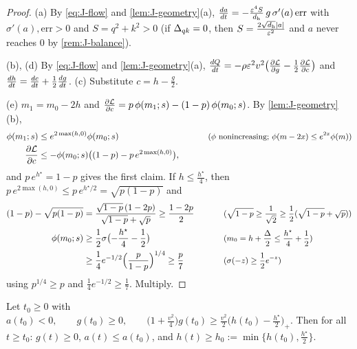 \begin{proof}
(a) By \cref{eq:J-flow} and \cref{lem:J-geometry}(a), $\ddt{a}=-\frac{\initscale^4S}{d_{\mathrm h}}\,g\,\sigma'(a)\,\mathrm{err}$ with $\sigma'(a),\mathrm{err}>0$ and $S=q^2+k^2>0$ (if $\Delta_{qk}=0$, then $S=\frac{2\sqrt{d_{\mathrm h}}|a|}{\varepsilon^2}$ and $a$ never reaches $0$ by \cref{rem:J-balance}).

(b), (d) By \cref{eq:J-flow} and \cref{lem:J-geometry}(a), $\ddt{Q}=-\rho\initscale^2v^2\bigl(\pd{\mathcal L}{g}-\frac{1}{2}\pd{\mathcal L}{c}\bigr)$ and
$\ddt{h}=\ddt{c}+\frac{1}{2}\ddt{g}$. (c) Substitute $c=h-\frac{g}{2}$.

(e) $m_1=m_0-2h$ and $\pd{\mathcal L}{c}=p\,\phi(m_1;s)-(1-p)\,\phi(m_0;s)$. By \cref{lem:J-geometry}(b),
\begin{alignat*}{2}
 \phi(m_1;s)&\le e^{2\max(h,0)}\phi(m_0;s) &\qquad& \why{$\phi$ nonincreasing; $\phi(m-2x)\le e^{2x}\phi(m)$}\\
 \pd{\mathcal L}{c}&\le-\phi(m_0;s)\bigl((1-p)-p\,e^{2\max(h,0)}\bigr),
\end{alignat*}
and $p\,e^{h^\star}=1-p$ gives the first claim. If $h\le\frac{h^\star}{4}$, then $p\,e^{2\max(h,0)}\le p\,e^{h^\star/2}=\sqrt{p(1-p)}$ and
\begin{alignat*}{2}
 (1-p)-\sqrt{p(1-p)}&=\frac{\sqrt{1-p}\,(1-2p)}{\sqrt{1-p}+\sqrt p}\ge\frac{1-2p}{2} &\qquad& \why{$\sqrt{1-p}\ge\tfrac{1}{\sqrt2}\ge\tfrac{1}{2}(\sqrt{1-p}+\sqrt p)$}\\
 \phi(m_0;s)&\ge\tfrac{1}{2}\sigma\bigl(-\tfrac{h^\star}{4}-\tfrac{1}{2}\bigr) && \why{$m_0=h+\tfrac{\Delta}{2}\le\tfrac{h^\star}{4}+\tfrac{1}{2}$}\\
 &\ge\tfrac{1}{4}e^{-1/2}\Bigl(\frac{p}{1-p}\Bigr)^{1/4}\ge\frac{p}{7} && \why{$\sigma(-z)\ge\tfrac{1}{2}e^{-z}$}
\end{alignat*}
using $p^{1/4}\ge p$ and $\frac{1}{4}e^{-1/2}\ge\frac{1}{7}$. Multiply.
\end{proof}

\begin{lemma}
\label{lem:J-align}
Let $t_0\ge0$ with
 $a(t_0)<0,\qquad g(t_0)\ge0,\qquad \bigl(1+\tfrac{v^2}{4}\bigr)g(t_0)\ge\tfrac{v^2}{2}\bigl(h(t_0)-\tfrac{h^\star}{2}\bigr)_+ .$ 
Then for all $t\ge t_0$: $g(t)\ge0$, $a(t)\le a(t_0)$, and $h(t)\ge h_0:=\min\{h(t_0),\frac{h^\star}{2}\}$.
\end{lemma}

